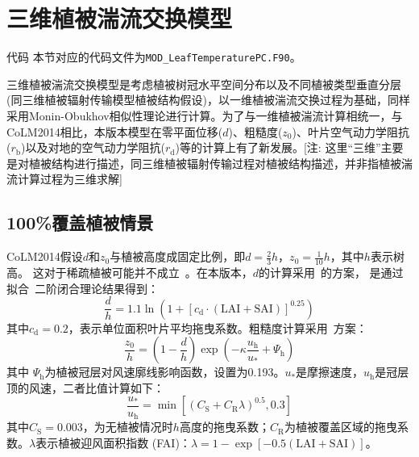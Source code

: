 \section{三维植被湍流交换模型}\label{三维植被湍流}
\begin{mymdframed}{代码}
  本节对应的代码文件为\texttt{MOD\_LeafTemperaturePC.F90}。
\end{mymdframed}

三维植被湍流交换模型是考虑植被树冠水平空间分布以及不同植被类型垂直分层(同三维植被辐射传输模型植被结构假设)，以一维植被湍流交换过程为基础，同样采用Monin-Obukhov相似性理论进行计算。为了与一维植被湍流计算相统一，与CoLM2014相比，本版本模型在零平面位移($d$)、粗糙度($z_0$)、叶片空气动力学阻抗($r_{\mathrm {b}}$)以及对地的空气动力学阻抗($r_{\mathrm {d}}$)等的计算上有了新发展。[注: 这里“三维”主要是对植被结构进行描述，同三维植被辐射传输过程对植被结构描述，并非指植被湍流计算过程为三维求解]


\subsection{100\%覆盖植被情景}\label{百分百植被覆盖湍流}
CoLM2014假设$d$和$z_0$与植被高度成固定比例，即$d=\frac{2}{3}h$，$z_0=\frac{1}{10}h$，其中$h$表示树高。
这对于稀疏植被可能并不成立~\citep{zeng2007consistent}。在本版本，$d$的计算采用~\citet{choudhury1988}的方案，
是通过拟合~\citet{shaw1982aerodynamic}二阶闭合理论结果得到：
\begin{equation}\label{dOh}
  \frac{d}{h}=1.1 \ln \left (1+\left[c_{\mathrm{d}} \cdot (\text {LAI} + \text {SAI})\right]^{0.25} \right)
\end{equation}
其中$c_{\mathrm {d}}=0.2$，表示单位面积叶片平均拖曳系数。粗糙度计算采用~\citet{raupach1992drag,raupach1994simplified}方案：
\begin{equation}\label{zOh}
  \frac{z_{0}}{h}=\left(1-\frac{d}{h}\right) \exp \left(-\kappa \frac{u_{\mathrm{h}}}{u_{*}}+\Psi_{\mathrm{h}}\right)
\end{equation}
其中%
$\Psi_{\mathrm h}$为植被冠层对风速廓线影响函数，设置为0.193。$u_\ast$是摩擦速度，$u_{\mathrm h}$是冠层顶的风速，二者比值计算如下：
\begin{equation}\label{ustrarOuh}
  \frac{u_{*}}{u_{\mathrm{h}}}=\min \left[\left(C_{\mathrm{S}}+C_{\mathrm{R}} \lambda\right)^{0.5}, 0.3\right]
\end{equation}
其中$C_{\mathrm {S}}=0.003$，为无植被情况时$h$高度的拖曳系数；$C_{\mathrm {R}}$为植被覆盖区域的拖曳系数。$\lambda$表示植被迎风面积指数 (FAI)：$\lambda=1-\exp{\left[-0.5 (\text {LAI}+\text {SAI})\right]}$。


